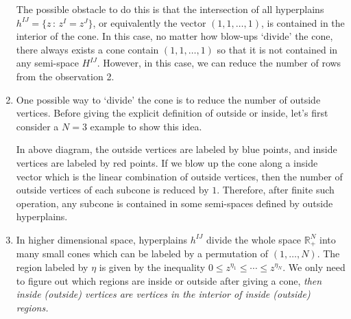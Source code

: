 \documentclass[12pt]{article}
\theoremstyle{definition}
\theoremstyle{plain}
\begin{document}
\begin{enumerate}
	The possible obstacle to do this is that the intersection of 
	all hyperplains $h^{IJ}=\{z\,:\, z^I=z^J\}$, 
	or equivalently the vector $(1,1,\dots,1)$, 
	is contained in the interior of the cone.
	In this case, no matter how blow-ups `divide' the cone, 
	there always exists a cone contain
	$(1,1,\dots,1)$ so that it is not contained in any semi-space $H^{IJ}$.
	However, in this case, we can reduce the number of rows from the observation
	2.

\item 
	One possible way to `divide' the cone is to reduce the number 
	of outside vertices.
	Before giving the explicit definition of outside or inside, 
	let's first consider a $N=3$ example to show this idea.
	\begin{center}
	\end{center}
In above diagram, the outside vertices are labeled by blue points, and inside vertices are
labeled by red points. If we blow up the cone along a inside vector which is 
the linear combination of outside vertices, then the number of outside
vertices of each subcone is reduced by $1$. Therefore, after finite such operation,
any subcone is contained in some semi-spaces defined by outside hyperplains.

\item
	In higher dimensional space, hyperplains $h^{IJ}$ divide 
	the whole space $\mathbb R_+^N$ into many small cones which 
	can be labeled by a permutation of $(1,\dots,N)$. 
	The region labeled by $\eta$ is given by the inequality 
	$0\leq z^{\eta_1}\leq \cdots\leq z^{\eta_N}$. 
	We only need to figure out which regions are inside or outside 
	after giving a cone, \textit{then inside (outside) vertices are vertices 
	in the interior of inside (outside) regions.}
	

\end{enumerate}
\end{document}
